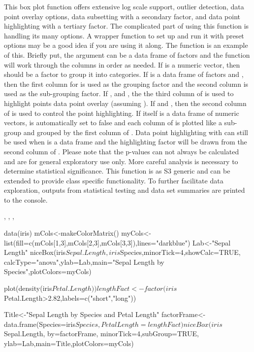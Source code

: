 \documentclass[a4paper]{book}
\begin{document}
\begin{Details}\relax
This box plot function offers extensive log scale support, outlier detection, data point overlay options, data subsetting with a secondary factor, and data point highlighting with a tertiary factor.
The complicated part of using this function is handling its many options. A wrapper function to set up and run it with preset options may be a good idea if you are using it along. The function  is an example of this.
Briefly put, the  argument can be a data frame of factors and the function will  work through the columns in order as needed.
If  is a numeric vector, then  should be a factor to group it into categories. If  is a data frame of factors and , then the first column for 
is used as the grouping factor and the second column is used as the sub-grouping factor. If , and , the the third column of 
is used to highlight points data point overlay (assuming ). If  and , then the second column of  is used to control
the point highlighting. If  itself is a data frame of numeric vectors,  is automatically set to false and each column of  is plotted like a sub-group and grouped
by the first column of . Data point highlighting with  can still be used when  is a data frame and the highlighting factor will be drawn from the second column of .
Please note that the p-values can not always be calculated and are for general exploratory use only. More careful analysis is necessary to determine statistical significance.
This function is as S3 generic and can be extended to provide class specific functionality. To further facilitate data exploration, outputs from statistical testing and data set summaries
are printed to the console.
\end{Details}
%
\begin{SeeAlso}\relax
{}, , , 
\end{SeeAlso}
%
\begin{Examples}
\begin{ExampleCode}
data(iris)
mCols<-makeColorMatrix()
myCols<-list(fill=c(mCols[1,3],mCols[2,3],mCols[3,3]),lines="darkblue")
Lab<-"Sepal Length"
niceBox(iris$Sepal.Length,iris$Species,minorTick=4,showCalc=TRUE,
    calcType="anova",ylab=Lab,main="Sepal Length by Species",plotColors=myCols)


plot(density(iris$Petal.Length))
lengthFact<-factor(iris$Petal.Length>2.82,labels=c("short","long"))


Title<-"Sepal Length by Species and Petal Length"
factorFrame<-data.frame(Species=iris$Species,PetalLength=lengthFact)
niceBox(iris$Sepal.Length, by=factorFrame, minorTick=4,subGroup=TRUE,
    ylab=Lab,main=Title,plotColors=myCols)
\end{ExampleCode}
\end{Examples}
\end{document}
